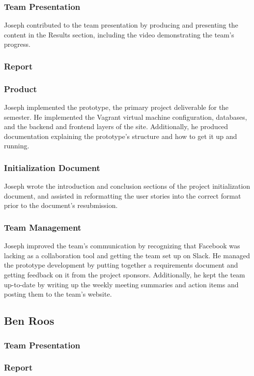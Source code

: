 \documentclass[12pt]{article}
\begin{document}
\begin{spacing}{1.5}
\subsubsection{Team Presentation}
Joseph contributed to the team presentation by producing and presenting the content in the Results section, including the video demonstrating the team's progress.
\subsubsection{Report}
\subsubsection{Product}
Joseph implemented the prototype, the primary project deliverable for the semester. He implemented the Vagrant virtual machine configuration, databases, and the backend and frontend layers of the site. Additionally, he produced documentation explaining the prototype's structure and how to get it up and running.
\subsubsection{Initialization Document}
Joseph wrote the introduction and conclusion sections of the project initialization document, and assisted in reformatting the user stories into the correct format prior to the document's resubmission.
\subsubsection{Team Management}
Joseph improved the team's communication by recognizing that Facebook was lacking as a collaboration tool and getting the team set up on Slack. He managed the prototype development by putting together a requirements document and getting feedback on it from the project sponsors. Additionally, he kept the team up-to-date by writing up the weekly meeting summaries and action items and posting them to the team's website.

\clearpage

\subsection{Ben Roos}
\subsubsection{Team Presentation}
\subsubsection{Report}

\end{spacing}
\end{document}
